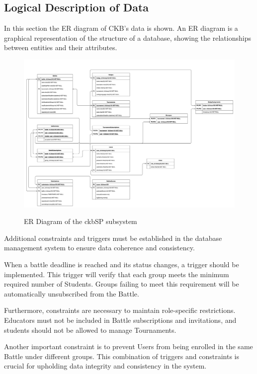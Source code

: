 \documentclass{Configuration_Files/Template}
\begin{document}
\subsection{Logical Description of Data}

In this section the ER diagram of CKB's data is shown. An ER diagram is a graphical representation of the structure of a database, showing the relationships between entities and their attributes.

\begin{figure}[H]
\centering
\includegraphics[scale = 0.3]{Images/diagrams/ER_Diagram.png}\\
\caption{ER Diagram of the ckbSP subsystem}
\end{figure}

Additional constraints and triggers must be established in the database management system to ensure data coherence and consistency.

When a battle deadline is reached and its status changes, a trigger should be implemented. This trigger will verify that each group meets the minimum required number of Students. Groups failing to meet this requirement will be automatically unsubscribed from the Battle.

Furthermore, constraints are necessary to maintain role-specific restrictions. Educators must not be included in Battle subscriptions and invitations, and students should not be allowed to manage Tournaments.

Another important constraint is to prevent Users from being enrolled in the same Battle under different groups. This combination of triggers and constraints is crucial for upholding data integrity and consistency in the system.
\end{document}
